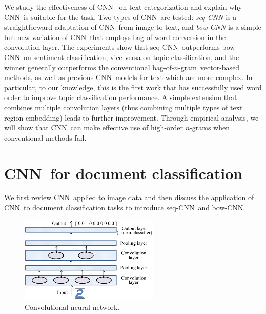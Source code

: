 \documentclass[11pt,letterpaper]{article}
\newcommand{\cnn}{CNN}
\newcommand{\scnn}{seq-CNN}
\newcommand{\bcnn}{bow-CNN}
\newcommand{\bongram}{bag-of-$n$-gram}
\begin{document}
We 
study the effectiveness of \cnn\
on text categorization and explain why \cnn\ is suitable for the task.  
Two types of \cnn\ are tested: 
{\em \scnn} is a straightforward adaptation of \cnn\ from image to text, and 
{\em \bcnn} is a simple but new variation of \cnn\ that employs bag-of-word conversion 
in the convolution layer.  
The experiments show that \scnn\ outperforms \bcnn\ on sentiment classification, 
vice versa on topic classification, 
and the winner generally outperforms the conventional \bongram\ vector-based methods, as well as 
previous \cnn\ models for text which are more complex. 
%                   
In particular, to our knowledge, this is the first work that has successfully used 
word order to %
improve topic classification performance.  
%
A simple extension that combines multiple convolution layers (thus 
combining multiple types of text region embedding) 
leads to further improvement.  
Through empirical analysis, we will show that 
\cnn\ can make effective use of high-order $n$-grams when conventional methods fail.  

\section{\cnn\ for document classification}
\label{sec:method}
 
We first review \cnn\ applied to image data and then 
discuss the application of \cnn\ to document classification tasks 
to introduce \scnn\ and \bcnn.  

\begin{figure}
\centering
\includegraphics[width=2.6in]{cnn}
\vspace{-0.1in}
\caption{\label{fig:cnn} \small
Convolutional neural network.  %
}
\end{figure}
\end{document}
